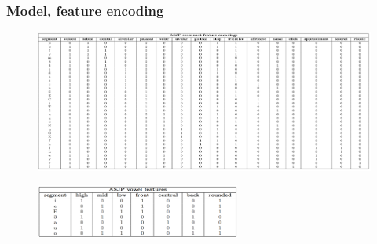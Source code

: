 \documentclass[11pt]{beamer}
\begin{document}
\begin{frame}
    \frametitle{Model, feature encoding}
    \begin{figure}
        \centering
        \includegraphics[scale=.21]{graphics/asjp_cons.png}
    \end{figure} 
    \begin{figure}[htp]
            \centering
            \includegraphics[width=0.6\textwidth ]{graphics/asjp_vowels.png}
    \end{figure}
 \end{frame}
\end{document}
